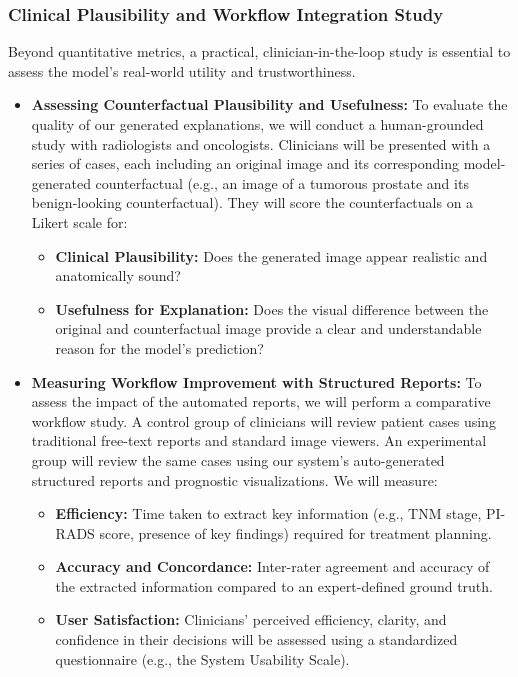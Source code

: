 \documentclass[11pt, a4paper]{article}
\begin{document}
\subsubsection{Clinical Plausibility and Workflow Integration Study}
Beyond quantitative metrics, a practical, clinician-in-the-loop study is essential to assess the model's real-world utility and trustworthiness.
\begin{itemize}
    \item \textbf{Assessing Counterfactual Plausibility and Usefulness:} To evaluate the quality of our generated explanations, we will conduct a human-grounded study with radiologists and oncologists. Clinicians will be presented with a series of cases, each including an original image and its corresponding model-generated counterfactual (e.g., an image of a tumorous prostate and its benign-looking counterfactual). They will score the counterfactuals on a Likert scale for:
    \begin{itemize}
        \item \textbf{Clinical Plausibility:} Does the generated image appear realistic and anatomically sound?
        \item \textbf{Usefulness for Explanation:} Does the visual difference between the original and counterfactual image provide a clear and understandable reason for the model's prediction?
    \end{itemize}
    \item \textbf{Measuring Workflow Improvement with Structured Reports:} To assess the impact of the automated reports, we will perform a comparative workflow study. A control group of clinicians will review patient cases using traditional free-text reports and standard image viewers. An experimental group will review the same cases using our system's auto-generated structured reports and prognostic visualizations. We will measure:
    \begin{itemize}
        \item \textbf{Efficiency:} Time taken to extract key information (e.g., TNM stage, PI-RADS score, presence of key findings) required for treatment planning.
        \item \textbf{Accuracy and Concordance:} Inter-rater agreement and accuracy of the extracted information compared to an expert-defined ground truth.
        \item \textbf{User Satisfaction:} Clinicians' perceived efficiency, clarity, and confidence in their decisions will be assessed using a standardized questionnaire (e.g., the System Usability Scale).
    \end{itemize}
\end{itemize}
\end{document}

